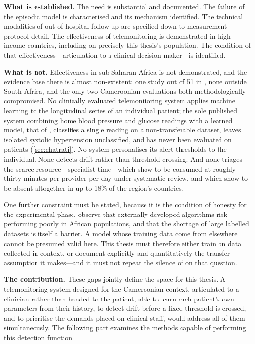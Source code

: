 \documentclass[12pt,a4paper,oneside]{report}
\begin{document}
\textbf{What is established.} The need is substantial and documented. The failure of the episodic model is characterised and its mechanism identified. The technical modalities of out-of-hospital follow-up are specified down to measurement protocol detail. The effectiveness of telemonitoring is demonstrated in high-income countries, including on precisely this thesis's population. The condition of that effectiveness---articulation to a clinical decision-maker---is identified.

\textbf{What is not.} Effectiveness in sub-Saharan Africa is not demonstrated, and the evidence base there is almost non-existent: one study out of 51 in \textcite{mao2020}, none outside South Africa, and the only two Cameroonian evaluations both methodologically compromised. No clinically evaluated telemonitoring system applies machine learning to the longitudinal series of an individual patient; the sole published system combining home blood pressure and glucose readings with a learned model, that of \textcite{chatrati2022}, classifies a single reading on a non-transferable dataset, leaves isolated systolic hypertension unclassified, and has never been evaluated on patients (\cref{sec:chatrati}). No system personalises its alert thresholds to the individual. None detects drift rather than threshold crossing. And none triages the scarce resource---specialist time---which \textcite{kingue2013} show to be consumed at roughly thirty minutes per provider per day under systematic review, and which \textcite{segun2025} show to be absent altogether in up to 18\% of the region's countries.

One further constraint must be stated, because it is the condition of honesty for the experimental phase. \Textcite{segun2025} observe that externally developed algorithms risk performing poorly in African populations, and that the shortage of large labelled datasets is itself a barrier. A model whose training data come from elsewhere cannot be presumed valid here. This thesis must therefore either train on data collected in context, or document explicitly and quantitatively the transfer assumption it makes---and it must not repeat the silence of \textcite{chatrati2022} on that question.

\textbf{The contribution.} These gaps jointly define the space for this thesis. A telemonitoring system designed for the Cameroonian context, articulated to a clinician rather than handed to the patient, able to learn each patient's own parameters from their history, to detect drift before a fixed threshold is crossed, and to prioritise the demands placed on clinical staff, would address all of them simultaneously. The following part examines the methods capable of performing this detection function.
\end{document}
